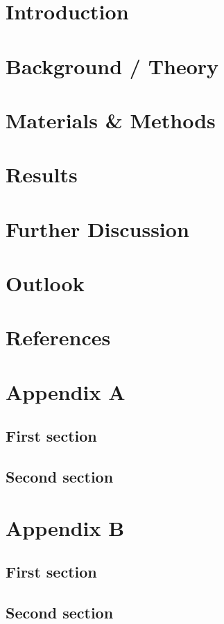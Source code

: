 \documentclass[a4paper,12pt]{report}
\begin{document}
\chapter{Introduction}

\chapter{Background / Theory}

\chapter{Materials \& Methods}

\chapter{Results}

\chapter{Further Discussion}

\chapter{Outlook}


\chapter{References}
\printbibliography[ heading=none]


\begin{appendices}
  \chapter{Appendix A}
   \section{First section}
   \section{Second section}

    \chapter{Appendix B}
    \section{First section}
     \section{Second section}
\end{appendices}
\end{document}
